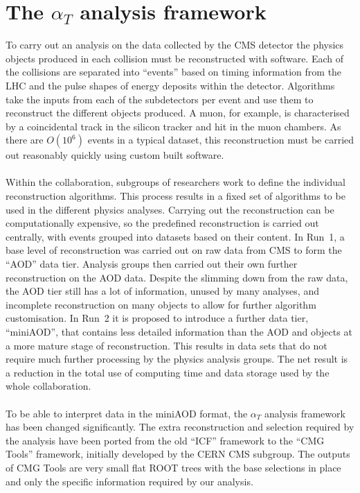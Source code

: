 
\section{The \boldmath $\alpha_T$ analysis framework}
\label{sec:analysisFw}

To carry out an analysis on the data collected by the CMS detector the physics objects produced in each collision must be reconstructed with software. Each of the collisions are separated into ``events'' based on timing information from the LHC and the pulse shapes of energy deposits within the detector. Algorithms take the inputs from each of the subdetectors per event and use them to reconstruct the different objects produced. A muon, for example, is characterised by a coincidental track in the silicon tracker and hit in the muon chambers. As there are $O(10^6)$ events in a typical dataset, this reconstruction must be carried out reasonably quickly using custom built software.
\\\\
Within the collaboration, subgroups of researchers work to define the individual reconstruction algorithms. This process results in a fixed set of algorithms to be used in the different physics analyses. Carrying out the reconstruction can be computationally expensive, so the predefined reconstruction is carried out centrally, with events grouped into datasets based on their content. In Run~1, a base level of reconstruction was carried out on raw data from CMS to form the ``AOD'' data tier. Analysis groups then carried out their own further reconstruction on the AOD data. Despite the slimming down from the raw data, the AOD tier still has a lot of information, unused by many analyses, and incomplete reconstruction on many objects to allow for further algorithm customisation. In Run~2 it is proposed to introduce a further data tier, ``miniAOD'', that contains less detailed information than the AOD and objects at a more mature stage of reconstruction. This results in data sets that do not require much further processing by the physics analysis groups. The net result is a reduction in the total use of computing time and data storage used by the whole collaboration.
\\\\
To be able to interpret data in the miniAOD format, the $\alpha_T$ analysis framework has been changed significantly. The extra reconstruction and selection required by the analysis have been ported from the old ``ICF'' framework to the ``CMG Tools'' framework, initially developed by the CERN CMS subgroup. The outputs of CMG Tools are very small flat ROOT trees with the base selections in place and only the specific information required by our analysis.
